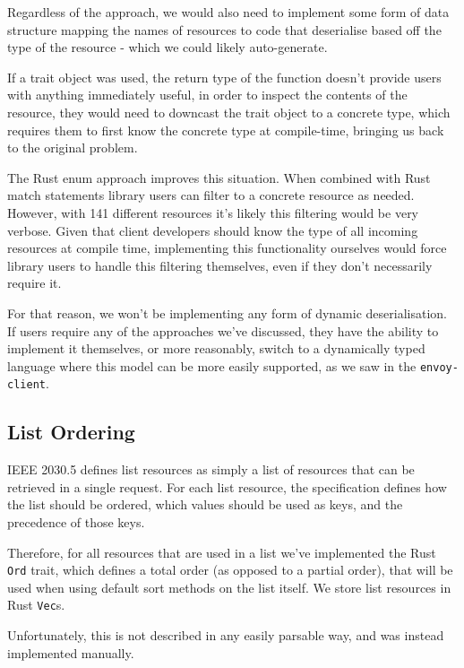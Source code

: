 Regardless of the approach, we would also need to implement some form of data structure mapping the names of resources to code that deserialise based off the type of the resource - which we could likely auto-generate.

If a trait object was used, the return type of the function doesn't provide users with anything immediately useful, in order to inspect the contents of the resource, they would need to downcast the trait object to a concrete type, which requires them to first know the concrete type at compile-time, bringing us back to the original problem.

The Rust enum approach improves this situation. When combined with Rust match statements library users can filter to a concrete resource as needed. However, with 141 different resources it's likely this filtering would be very verbose. Given that client developers should know the type of all incoming resources at compile time, implementing this functionality ourselves would force library users to handle this filtering themselves, even if they don't necessarily require it.

For that reason, we won't be implementing any form of dynamic deserialisation. If users require any of the approaches we've discussed, they have the ability to implement it themselves, or more reasonably, switch to a dynamically typed language where this model can be more easily supported, as we saw in the \texttt{envoy-client}.

\subsection{List Ordering}
IEEE 2030.5 defines list resources as simply a list of resources that can be retrieved in a single request. For each list resource, the specification defines how the list should be ordered, which values should be used as keys, and the precedence of those keys. \cite{IEEE2030.5}

Therefore, for all resources that are used in a list we've implemented the Rust \texttt{Ord} trait, which defines a total order (as opposed to a partial order), that will be used when using default sort methods on the list itself. We store list resources in Rust \texttt{Vec}s.

Unfortunately, this is not described in any easily parsable way, and was instead implemented manually.

